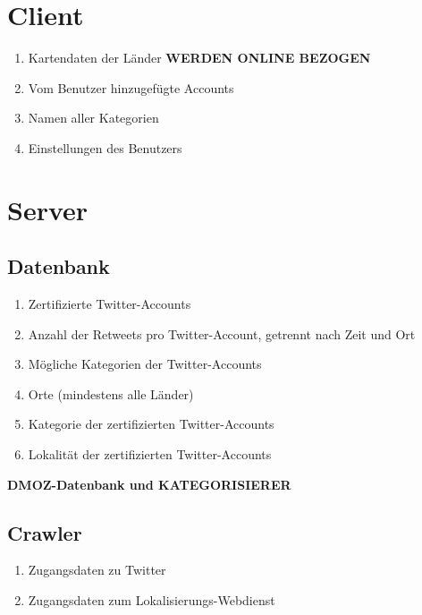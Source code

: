 \section{Client}
\begin{enumerate}[align=left,leftmargin=4em, label={\textbf{\textbackslash PD10\arabic*0\textbackslash}} ]
	\item Kartendaten der Länder \textbf{WERDEN ONLINE BEZOGEN}
	\item Vom Benutzer hinzugefügte Accounts
	\item Namen aller Kategorien
	\item Einstellungen des Benutzers
\end{enumerate}	
	
\section{Server}
\subsection{Datenbank}
\begin{enumerate}[align=left,leftmargin=4em, label={\textbf{\textbackslash PD20\arabic*0\textbackslash}} ]
	\item Zertifizierte Twitter-Accounts	
	\item Anzahl der Retweets pro Twitter-Account, getrennt nach Zeit und Ort
	\item Mögliche Kategorien der Twitter-Accounts
	\item Orte (mindestens alle Länder)
	\item Kategorie der zertifizierten Twitter-Accounts
	\item Lokalität der zertifizierten Twitter-Accounts
\end{enumerate}

\textbf{DMOZ-Datenbank und KATEGORISIERER}

\subsection{Crawler}
\begin{enumerate}[align=left,leftmargin=4em, label={\textbf{\textbackslash PD10\arabic*0\textbackslash}} ]
	\item Zugangsdaten zu Twitter
	\item Zugangsdaten zum Lokalisierungs-Webdienst
\end{enumerate}%
